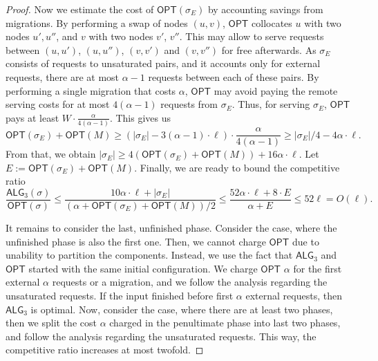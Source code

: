 \documentclass[manuscript,screen=true]{acmart}
\newcommand{\OPT}{\textsf{OPT}\xspace}
\newcommand{\TAlg}{{\ensuremath{\textsf{ALG}_{3}}}\xspace} %
\begin{document}
\begin{proof}
  Now we estimate the cost of $\OPT(\sigma_E)$ by accounting savings from migrations.
  By performing a swap of nodes $(u,v)$, $\OPT$ collocates $u$ with two nodes $u', u''$, and $v$ with two nodes $v'$, $v''$.
  This may allow to serve requests between $(u,u')$, $(u,u'')$, $(v,v')$ and $(v,v'')$ for free afterwards.
  As $\sigma_E$ consists of requests to unsaturated pairs, and it accounts only for external requests, there are at most $\alpha-1$ requests between each of these pairs.
  By performing a single migration that costs $\alpha$, $\OPT$ may avoid paying the remote serving costs for at most $4 (\alpha - 1)$ requests from $\sigma_E$.
  Thus, for serving $\sigma_E$, $\OPT$ pays at least $W \cdot \frac{\alpha}{4 (\alpha-1)}$.
  This gives us
  \begin{equation*}
    \OPT(\sigma_E) + \OPT(M)  \geq (|\sigma_E|-3(\alpha - 1)\cdot \ell) \cdot \frac{\alpha}{4 (\alpha-1)}
    \geq |\sigma_E| / 4 - 4 \alpha \cdot \ell.
  \end{equation*}
  From that, we obtain $|\sigma_E| \geq 4(\OPT(\sigma_E)+\OPT(M)) + 16\alpha \cdot \ell$.
  Let $E := \OPT(\sigma_E) + \OPT(M)$. Finally, we are ready to bound the competitive ratio
  \begin{equation*}
    \frac{\TAlg(\sigma)}{\OPT(\sigma)} \leq \frac{10\alpha \cdot \ell + |\sigma_E|}{(\alpha + \OPT(\sigma_E) + \OPT(M))/2} \leq \frac{52\alpha\cdot\ell + 8\cdot E}{\alpha + E} \leq 52 \ell = O(\ell).
  \end{equation*}

  \medskip

  It remains to consider the last, unfinished phase.
  Consider the case, where the unfinished phase is also the first one.
  Then, we cannot charge $\OPT$ due to unability to partition the components.
  Instead, we use the fact that \TAlg and $\OPT$ started with the same initial configuration.
  We charge $\OPT$ $\alpha$ for the first external $\alpha$ requests or a migration,
  and we follow the analysis regarding the unsaturated requests.
  If the input finished before first $\alpha$ external requests, then \TAlg is optimal.
  Now, consider the case, where there are at least two phases, then we split the cost $\alpha$ charged in the penultimate phase into last two phases, and follow the analysis regarding the unsaturated requests.
  This way, the competitive ratio increases at most twofold.
\end{proof}
\end{document}
